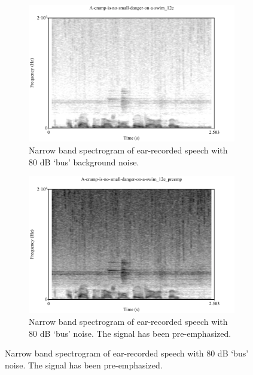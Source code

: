 \begin{figure}[h!]
\centering
\begin{subfigure}{0.475\textwidth}
  \centering
  \includegraphics[width=1\linewidth]{figure/spctgrmEarNarrow20kHz.pdf}
  \caption{Narrow band spectrogram of ear-recorded speech with 80 dB `bus' background noise.}
  \label{spctgrmEarNarrow20kHz}
\end{subfigure}%
\hfill
\begin{subfigure}{0.475\textwidth}
  \centering
  \includegraphics[width=1\linewidth]{figure/spctgrmNarrowEarNoisePremp.pdf}
  \caption{Narrow band spectrogram of ear-recorded speech with 80 dB `bus' noise.  The signal has been pre-emphasized.}
  \label{spctgrmNarrowEarNoisePremp_35}
\end{subfigure}

\end{figure}

